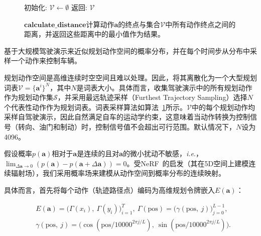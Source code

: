 \documentclass{article} %
\newcommand{\onedot}{.\xspace}
\def\ie{\emph{i.e}\onedot} \def\Ie{\emph{I.e}\onedot}
\begin{document}
\begin{figure}
\vspace{-4.5mm}
\LinesNotNumbered
\begin{algorithm}[H]
\SetAlgoLined
\DontPrintSemicolon
\SetNoFillComment
\footnotesize
{}
初始化: $\mathcal{V} \leftarrow \emptyset$ \;
返回: $\mathcal{V}$
\caption{规划词表采样算法。}
\label{algo:vocab}
\end{algorithm}
\captionsetup{labelformat=empty}
\caption{$\textbf{calculate\_distance}$计算动作$\bm{a}$的终点与集合$\mathcal{V}$中所有动作终点之间的距离，并返回这些距离中的最小值作为结果。}
\vspace{-5mm}
\end{figure}


基于大规模驾驶演示来近似规划动作空间的概率分布，并在每个时间步从分布中采样一个动作来控制车辆。


规划动作空间是高维连续时空空间且难以处理。因此，将其离散化为一个大型规划词表$\mathcal{V}=\{\bm{a}^i\}^N$，其中$N$是词表大小。具体而言，收集驾驶演示中的所有规划动作作为规划动作集$\mathcal{S}$，并采用最远轨迹采样（Furthest Trajectory Sampling）选择$N$个代表性动作作为规划词表。词表采样算法如算法~\ref{algo:vocab}所示。$\mathcal{V}$中的每个规划动作均采样自驾驶演示，因此自然满足自车的运动学约束，这意味着当动作转换为控制信号（转向、油门和制动）时，控制信号值不会超出可行范围。默认情况下，$N$设为4096。

假设概率$p(\bm{a})$相对于$\bm{a}$是连续的且对$\bm{a}$的微小扰动不敏感，\ie，$\lim_{\Delta \bm{a} \to 0} {\left( p(\bm{a})   -  p(\bm{a}+\Delta \bm{a}) \right)} = 0$。受NeRF~\citep{nerf}的启发（其在5D空间上建模连续辐射场），我们采用概率场来建模从动作空间到概率分布的连续映射。

具体而言，首先将每个动作（轨迹路径点）编码为高维规划令牌嵌入$E(\bm{a})$：


\begin{equation}
\begin{aligned}
& E(\bm{a}) = \bigl(\Gamma(x_{i}), \ \Gamma(y_{i})\bigr)_{i=1}^{T}, \
\Gamma(\mathrm{pos}) = \bigl(\gamma(\mathrm{pos}, \ j)\bigr)_{j=0}^{L-1}, \\
& \gamma(\mathrm{pos}, \ j) = \bigl(\cos(\mathrm{pos}/{10000}^{2\pi j/L}), \ \sin(\mathrm{pos}/{10000}^{2\pi j/L})\bigr).
\end{aligned}
\end{equation}
\end{document}
